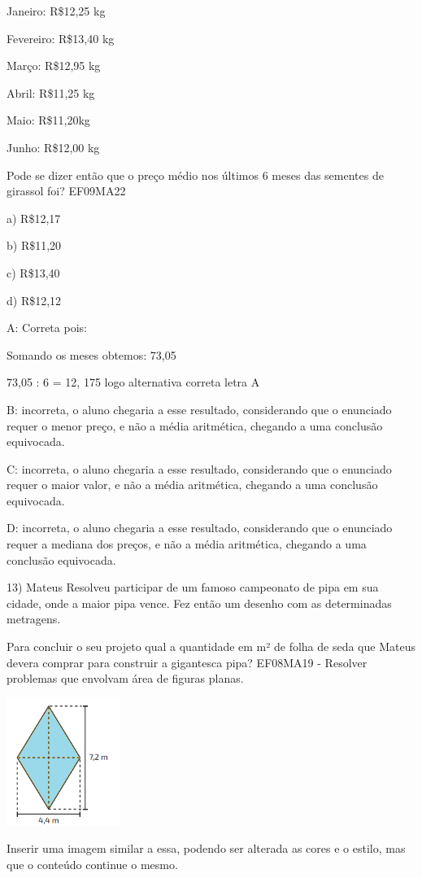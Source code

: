 Janeiro: R\$12,25 kg

Fevereiro: R\$13,40 kg

Março: R\$12,95 kg

Abril: R\$11,25 kg

Maio: R\$11,20kg

Junho: R\$12,00 kg

Pode se dizer então que o preço médio nos últimos 6 meses das sementes
de girassol foi? EF09MA22

a) R\$12,17

b) R\$11,20

c) R\$13,40

d) R\$12,12

A: Correta pois:

Somando os meses obtemos: 73,05

73,05 : 6 = 12, 175 logo alternativa correta letra A

B: incorreta, o aluno chegaria a esse resultado, considerando que o
enunciado requer o menor preço, e não a média aritmética, chegando a uma
conclusão equivocada.

C: incorreta, o aluno chegaria a esse resultado, considerando que o
enunciado requer o maior valor, e não a média aritmética, chegando a uma
conclusão equivocada.

D: incorreta, o aluno chegaria a esse resultado, considerando que o
enunciado requer a mediana dos preços, e não a média aritmética,
chegando a uma conclusão equivocada.

13) Mateus Resolveu participar de um famoso campeonato de pipa em sua
cidade, onde a maior pipa vence. Fez então um desenho com as
determinadas metragens.

Para concluir o seu projeto qual a quantidade em m² de folha de seda que
Mateus devera comprar para construir a gigantesca pipa? EF08MA19 -
Resolver problemas que envolvam área de figuras planas.

\includegraphics[width=1.45833in,height=1.63333in]{./imgSAEB_8_MAT/media/image59.png}

Inserir uma imagem similar a essa, podendo ser alterada as cores e o
estilo, mas que o conteúdo continue o mesmo.

